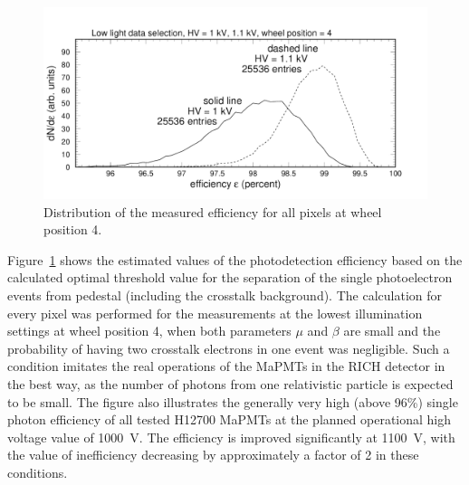 \begin{figure}[h!]
	\centering
	\includegraphics[width=0.98\linewidth, trim=0 12 50 35, clip]{figures/pglobal_eff.pdf}
	\caption{Distribution of the measured efficiency for all pixels at wheel position 4.}
	\label{fig:pglobal_eff}
\end{figure}
Figure~\ref{fig:pglobal_eff} shows the estimated values of the photodetection efficiency based on the calculated optimal threshold value for the separation of the single photoelectron events from pedestal (including the crosstalk background). The calculation for every pixel was performed for the measurements at the lowest illumination settings at wheel position 4, when both parameters $\mu$ and $\beta$ are small and the probability of having two crosstalk electrons in one event was negligible. Such a condition imitates the real operations of the MaPMTs in the RICH detector in the best way, as the number of photons from one relativistic particle is expected to be small. The figure also illustrates the generally very high (above 96\%) single photon efficiency of all tested H12700 MaPMTs at the planned operational high voltage value of 1000~V. The efficiency is improved significantly at 1100~V, with the value of inefficiency decreasing by approximately a factor of 2 in these conditions.

